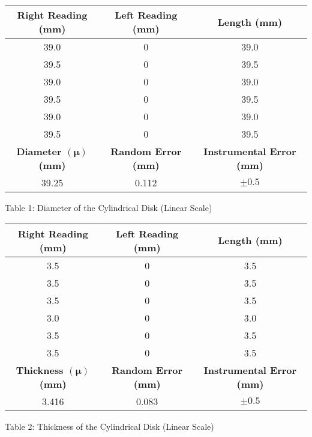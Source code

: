 \begin{center}
\begin{center}
    \begin{tabular}{|c|c|c|}
        \hline
        \textbf{Right Reading (mm)} & \textbf{Left Reading (mm)} & \textbf{Length (mm)}  \\
        \hline
        39.0 & 0 & 39.0 \\
        \hline
        39.5 & 0 & 39.5 \\
        \hline
        39.0 & 0 & 39.0 \\
        \hline
        39.5 & 0 & 39.5 \\
        \hline
        39.0 & 0 & 39.0 \\
        \hline
        39.5 & 0 & 39.5 \\
        \hline
        \hline
        \textbf{Diameter $(\bm{\mu})$ (mm)} & \textbf{Random Error (mm)} & \textbf{Instrumental Error (mm)}  \\
        \hline
        39.25 & 0.112 & \(\pm0.5\) \\
        \hline
    \end{tabular}
\end{center}
\vspace{3 mm}
Table 1: Diameter of the Cylindrical Disk (Linear Scale)
\begin{center}
    \begin{tabular}{|c|c|c|}
        \hline
        \textbf{Right Reading (mm)} & \textbf{Left Reading (mm)} & \textbf{Length (mm)}  \\
        \hline
        3.5 & 0 & 3.5 \\
        \hline
        3.5 & 0 & 3.5 \\
        \hline
        3.5 & 0 & 3.5 \\
        \hline
        3.0 & 0 & 3.0 \\
        \hline
        3.5 & 0 & 3.5 \\
        \hline
        3.5 & 0 & 3.5 \\
        \hline
        \hline
        \textbf{Thickness $(\bm{\mu})$ (mm)} & \textbf{Random Error (mm)} & \textbf{Instrumental Error (mm)}  \\
        \hline
        3.416 & 0.083 & \(\pm0.5\) \\
        \hline
    \end{tabular}
\end{center}
Table 2: Thickness of the Cylindrical Disk (Linear Scale)
\begin{center}
    \begin{tabular}{|c|c|}

\end{tabular}
\end{center}
\end{center}

